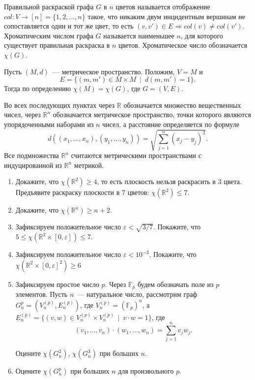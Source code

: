 Правильной раскраской графа $G$ в $n$ цветов называется отображение $col: V\to [n] = \{1,2,\dots, n\}$ такое, что никаким двум инцидентным вершинам не сопоставляется один и тот же цвет, то есть $(v,v')\in E \Rightarrow col(v)\neq col(v')$. Хроматическим числом графа $G$ называется наименьшее $n$, для которого существует правильная раскраска в $n$ цветов. Хроматическое число обозначается $\chi(G)$.

Пусть $(M,d)$~— метрическое пространство. Положим, $V = M$ и
	$$E = \{(m,m')\in M\times M\ \mid\ d(m,m') = 1\}.$$
Тогда по определению $\chi(M) = \chi(G)$, где $G = (V,E)$.

Во всех последующих пунктах через $\mathbb R$ обозначается множество вещественных чисел, через $\mathbb R^n$ обозначается метрическое пространство, точки которого являются упорядоченными наборами из $n$ чисел, а расстояние определяется по формуле
$$
d((x_1,\dots,x_n), (y_1,\dots,y_n)) =\sqrt{ \sum\limits_{j = 1}^n(x_j-y_j)^2}.
$$
Все подмножества $\mathbb R^n$ считаются метрическими пространствами с индуцированной из $\mathbb R^n$ метрикой.

\begin{enumerate}

\item Докажите, что $\chi(\mathbb R^2)\geq 4$, то есть плоскость нельзя раскрасить в $3$ цвета. Предъявите раскраску плоскости в $7$ цветов: $\chi(\mathbb R^2)\leq 7$.

\item Докажите, что $\chi(\mathbb R^n)\geq n+2$.

\item Зафиксируем положительное число $\varepsilon < \sqrt{3/7}$. Покажите, что $5\leq \chi(\mathbb R^2\times [0,\varepsilon])\leq 7$.

\item Зафиксируем положительное число $\varepsilon < 10^{-3}$. Покажите, что $\chi(\mathbb R^2\times [0,\varepsilon]^2)\geq 6$

\item Зафиксируем простое число $p$. Через $\mathbb F_p$ будем обозначать поле из $p$ элементов. Пусть $n$~— натуральное число, рассмотрим граф $G^p_n = (V^{(p)}_n,E^{(p)}_n)$, где $V^{(p)}_n = (\mathbb F_p)^n$, а $E^{(p)}_n = \{(v,w)\in V_n^{(p)}\times V^{(p)}_n\ \mid\ v\cdot w = 1\}$, где
$$
(v_1,\dots,v_n)\cdot(w_1,\dots,w_n) = \sum\limits_{j = 1}^nv_jw_j.
$$

 Оцените $\chi(G^2_n)$, $\chi(G^3_n)$ при больших $n$.


\item Оцените $\chi(G^p_n)$ при больших $n$ для произвольного $p$.

\end{enumerate}


